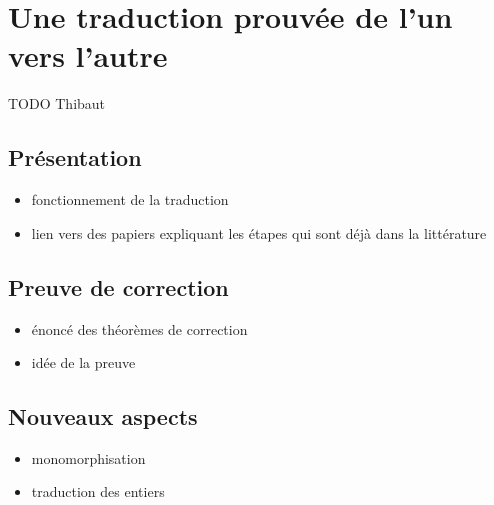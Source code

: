 \section{Une traduction prouvée de l'un vers l'autre}

TODO Thibaut


\subsection{Présentation}

\begin{itemize}
\item fonctionnement de la traduction
\item lien vers des papiers expliquant les étapes qui sont déjà dans la
  littérature
\end{itemize}


\subsection{Preuve de correction}

\begin{itemize}
\item énoncé des théorèmes de correction
\item idée de la preuve
\end{itemize}


\subsection{Nouveaux aspects}

\begin{itemize}
\item monomorphisation
\item traduction des entiers
\end{itemize}

